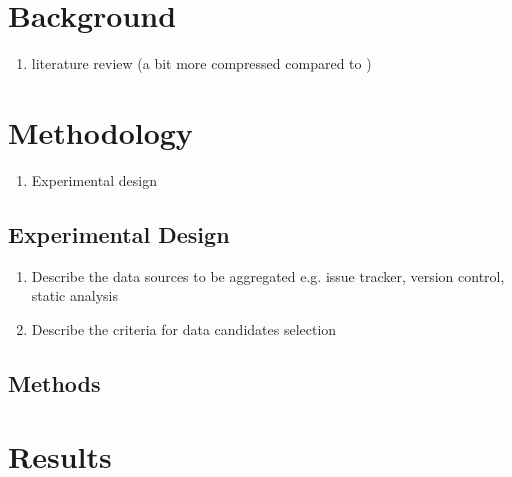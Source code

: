 \documentclass{mpaper}
\begin{document}
\section{Background}
\label{background}

\begin{enumerate}
  \item literature review (a bit more compressed compared to )
\end{enumerate}

\section{Methodology}
\label{methodology}

\begin{enumerate}
  \item Experimental design
\end{enumerate}

\subsection{Experimental Design}
\label{experimental-design}

\begin{enumerate}
  \item Describe the data sources to be aggregated e.g. issue tracker, version control, static analysis
  \item Describe the criteria for data candidates selection 
\end{enumerate}

\subsection{Methods}
\label{}

\section{Results}
\label{results}
\end{document}

